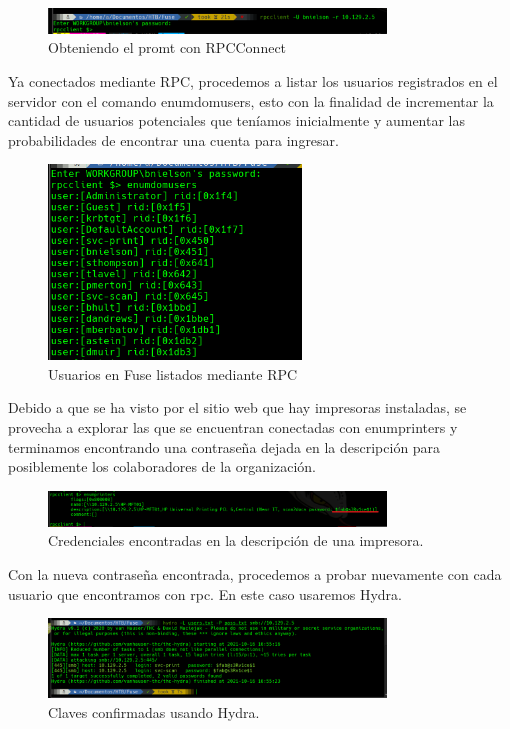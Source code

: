 \documentclass{article}
\begin{document}
\begin{figure}[h]
	\center
	\includegraphics[width=0.8\textwidth]{images/fuse/image12.png}
	\caption{Obteniendo el promt con RPCConnect}
\end{figure}

Ya conectados mediante RPC, procedemos a listar los usuarios registrados en el servidor con el comando enumdomusers, esto con la finalidad de incrementar la cantidad de usuarios potenciales que teníamos inicialmente y aumentar las probabilidades de encontrar una cuenta para ingresar.

\begin{figure}[h]
	\center
	\includegraphics[width=0.6\textwidth]{images/fuse/image13.png}
	\caption{Usuarios en Fuse listados mediante RPC}
\end{figure}

Debido a que se ha visto por el sitio web que hay impresoras instaladas, se provecha a explorar las que se encuentran conectadas con enumprinters y terminamos encontrando una contraseña dejada en la descripción para posiblemente los colaboradores de la organización.

\begin{figure}[H]
	\center
	\includegraphics[width=0.8\textwidth]{images/fuse/image14.png}
	\caption{Credenciales encontradas en la descripción de una impresora.}
\end{figure}

Con la nueva contraseña encontrada, procedemos a probar nuevamente con cada usuario que encontramos con rpc. En este caso usaremos Hydra. 
\clearpage
\begin{figure}[h]
	\center
	\includegraphics[width=0.8\textwidth]{images/fuse/image15.png}
	\caption{Claves confirmadas usando Hydra.}
\end{figure}
\end{document}
